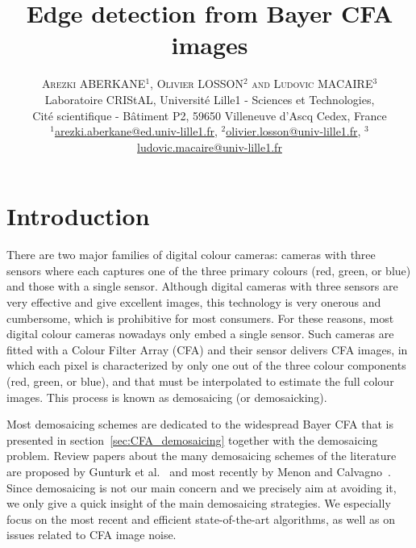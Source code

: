 \documentclass[twoside]{article}
\title{\vspace{-15mm}\fontsize{24pt}{10pt}\selectfont\textbf{Edge detection from Bayer CFA images}} %
\author{
\large
\textsc{Arezki ABERKANE$^{1}$, Olivier LOSSON$^{2}$ and Ludovic MACAIRE$^{3}$}\\[2mm] %
\normalsize Laboratoire CRIStAL, Universit\'e Lille1 - Sciences et Technologies,\\ \normalsize Cit\'e scientifique - B\^atiment P2, 59650 Villeneuve d'Ascq Cedex, France \\ %
\normalsize \href{mailto:arezki.aberkane@ed.univ-lille1.fr}{$^{1}$arezki.aberkane@ed.univ-lille1.fr},  
\href{mailto:olivier.losson@univ-lille1.fr}{$^{2}$olivier.losson@univ-lille1.fr},  
\href{mailto:ludovic.macaire@univ-lille1.fr}{$^{3}$ludovic.macaire@univ-lille1.fr} %
\vspace{-5mm}
}
\date{}
\begin{document}
\maketitle %



\begin{abstract}
  

\end{abstract}



\section{Introduction}

There are two major families of digital colour cameras: cameras with three sensors where each captures one of the three primary colours (red, green, or blue) and those with a single sensor. Although digital cameras with three sensors are very effective and give  excellent images,  this technology is very onerous and cumbersome, which is prohibitive for most consumers. For these reasons, most digital colour cameras nowadays only embed a single sensor. Such cameras are fitted with a Colour Filter Array (CFA) and their sensor delivers CFA images, in which each pixel is characterized by only one out of the three colour components (red, green, or blue), and that must be interpolated to estimate the full colour images. This process is known as demosaicing (or demosaicking).

Most demosaicing schemes are dedicated to the widespread Bayer CFA that is presented in section~\ref{sec:CFA_demosaicing} together with the demosaicing problem. Review papers about the many demosaicing schemes of the literature are proposed by Gunturk et al.~\cite{gunturk_ip_2002,li_vcip_2008} and most recently by Menon and Calvagno~\cite{menon_ic_2011}. Since demosaicing is not our main concern and we precisely aim at avoiding it, we only give a quick insight of the main demosaicing strategies. We especially focus on the most recent and efficient state-of-the-art algorithms, as well as on issues related to CFA image noise.
\end{document}
